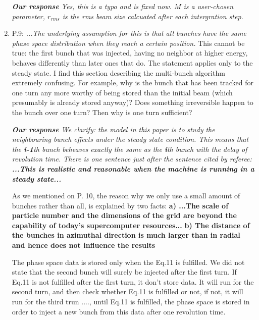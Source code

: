 \documentclass[10pt]{report}
\begin{document}
\begin{enumerate}
  \vspace{+2mm}
 {\it {\bf Our response} Yes, this is a typo and is fixed now. $M$ is a user-chosen parameter, $r_{rms}$ is the rms beam size calcuated after each intergration step.   
 }
 \vspace{+2mm}

 \item P.9: \textit{...The underlying assumption for this is that all bunches
 have the same phase space distribution when they reach a certain position.}
 This cannot be true: the first bunch that was injected, having no neighbor at
 higher energy, behaves differently than later ones that do. The statement
 applies only to the steady state. I find this section describing the
 multi-bunch algorithm extremely confusing. For example, why is the bunch that
 has been tracked for one turn any more worthy of being stored than the initial
 beam (which presumably is already stored anyway)? Does something irreversible
 happen to the bunch over one turn? Then why is one turn sufficient?
 
  \vspace{+2mm}
 {\it {\bf Our response} We clarify: the model in this paper is to study the neighbouring bunch effects under the steady state condition.
   This means that the  {\bf i-1}th bunch beheaves exactly the same as the {\bf i}th bunch with the delay of revolution time. 
   There is one sentence just after the sentence cited by referee: 
   {\bf ...This is realistic and reasonable when the machine is running in a steady state...}

   As we mentioned on P. 10,  the reason why we only use a small amount of bunches rather than all, is explained by two facts: 
   {\bf a) ...The scale of particle number and the dimensions of the grid are beyond the capability of today's supercomputer resources...}
   { \bf b) The distance of the bunches in azimuthal direction is much larger than in radial and hence does not influence the results }

   The phase space data is stored only when the Eq.11 is fulfilled.
   We did not state that the second bunch will surely be injected after the first turn. 
   If Eq.11 is not fulfilled after the first turn, it don't store data. It will run for the second turn, and then check whether Eq.11 is fulfilled or not, if not, it will run for 
   the third trun ...., until Eq.11 is fulfilled, the phase space is stored in order to inject a new bunch from this data after one revolution time.
 }
 \vspace{+2mm}
 

\end{enumerate}
\end{document}
